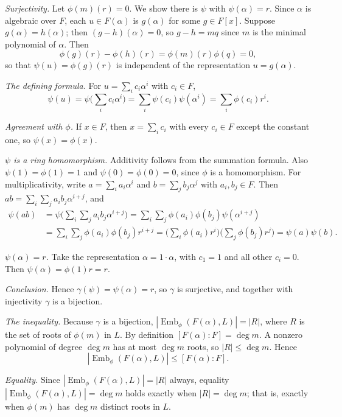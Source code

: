 \documentclass[11pt]{article}
\begin{document}
\emph{Surjectivity.} Let $\phi(m)(r)=0$. We show there is $\psi$ with $\psi(\alpha)=r$. Since $\alpha$ is algebraic over $F$, each $u\in F(\alpha)$ is $g(\alpha)$ for some $g\in F[x]$. Suppose $g(\alpha)=h(\alpha)$; then $(g-h)(\alpha)=0$, so $g-h=mq$ since $m$ is the minimal polynomial of $\alpha$. Then
\[
\phi(g)(r)-\phi(h)(r)=\phi(m)(r)\phi(q)=0,
\]
so that $\psi(u)=\phi(g)(r)$ is independent of the representation $u=g(\alpha)$.

\emph{The defining formula.} For $u=\sum_i c_i\alpha^i$ with $c_i\in F$,
\[
\psi(u)=\psi\Big(\sum_i c_i\alpha^i\Big)=\sum_i\psi(c_i)\psi(\alpha^i)=\sum_i\phi(c_i)r^i.
\]

\emph{Agreement with $\phi$.} If $x\in F$, then $x=\sum_i c_i$ with every $c_i\in F$ except the constant one, so $\psi(x)=\phi(x)$.

\emph{$\psi$ is a ring homomorphism.} Additivity follows from the summation formula. Also $\psi(1)=\phi(1)=1$ and $\psi(0)=\phi(0)=0$, since $\phi$ is a homomorphism. For multiplicativity, write $a=\sum_i a_i\alpha^i$ and $b=\sum_j b_j\alpha^j$ with $a_i,b_j\in F$. Then $ab=\sum_i\sum_j a_ib_j\alpha^{i+j}$, and
\begin{align*}
\psi(ab)&=\psi\Big(\sum_i\sum_j a_ib_j\alpha^{i+j}\Big)
=\sum_i\sum_j\phi(a_i)\phi(b_j)\psi(\alpha^{i+j})\\
&=\sum_i\sum_j\phi(a_i)\phi(b_j)r^{i+j}
=\Big(\sum_i\phi(a_i)r^i\Big)\Big(\sum_j\phi(b_j)r^j\Big)
=\psi(a)\psi(b).
\end{align*}

\emph{$\psi(\alpha)=r$.} Take the representation $\alpha=1\cdot\alpha$, with $c_1=1$ and all other $c_i=0$. Then $\psi(\alpha)=\phi(1)r=r$.

\emph{Conclusion.} Hence $\gamma(\psi)=\psi(\alpha)=r$, so $\gamma$ is surjective, and together with injectivity $\gamma$ is a bijection.

\emph{The inequality.} Because $\gamma$ is a bijection, $|\operatorname{Emb}_\phi(F(\alpha),L)|=|R|$, where $R$ is the set of roots of $\phi(m)$ in $L$. By definition $[F(\alpha):F]=\deg m$. A nonzero polynomial of degree $\deg m$ has at most $\deg m$ roots, so $|R|\le\deg m$. Hence
\[
|\operatorname{Emb}_\phi(F(\alpha),L)|\le[F(\alpha):F].
\]

\emph{Equality.} Since $|\operatorname{Emb}_\phi(F(\alpha),L)|=|R|$ always, equality $|\operatorname{Emb}_\phi(F(\alpha),L)|=\deg m$ holds exactly when $|R|=\deg m$; that is, exactly when $\phi(m)$ has $\deg m$ distinct roots in $L$.
\end{document}
